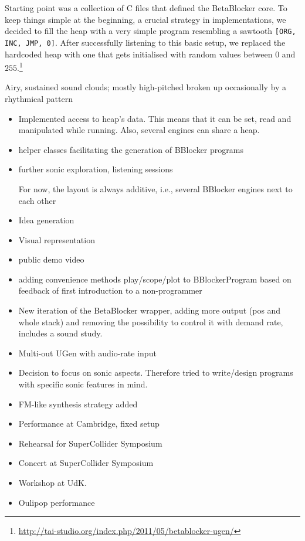 \documentclass[letterpaper, 12pt]{article}
\begin{document}
Starting point was a collection of C files that defined the BetaBlocker core.
To keep things simple at the beginning, a crucial strategy in implementations, we decided to fill the heap with a very simple program resembling a sawtooth \verb#[ORG, INC, JMP, 0]#. 
After successfully listening to this basic setup, we replaced the hardcoded heap with one that gets initialised with random values between $0$ and $255$.\footnote{\url{http://tai-studio.org/index.php/2011/05/betablocker-ugen/}}


Airy, sustained sound clouds; mostly high-pitched broken up occasionally by a rhythmical pattern


\begin{itemize}	 
\item Implemented access to heap's data. This means that it can be set, read and manipulated while running. Also, several engines can share a heap. 
\item helper classes facilitating the generation of BBlocker programs 
\item further sonic exploration, listening sessions 

	For now, the layout is always additive, i.e., several BBlocker engines next to each other

\item Idea generation
\item Visual representation
\item public demo video
\item adding convenience methods play/scope/plot to BBlockerProgram based on feedback of first introduction to a non-programmer
\item New iteration of the BetaBlocker wrapper, adding more output (pos and whole stack) and removing the possibility to control it with demand rate,
	includes a sound study.
\item Multi-out UGen with audio-rate input
\item Decision to focus on sonic aspects. Therefore tried to write/design programs with specific sonic features in mind.
\item FM-like synthesis strategy added
\item Performance at Cambridge, fixed setup
\item Rehearsal for SuperCollider Symposium
\item Concert at SuperCollider Symposium
\item Workshop at UdK.
\item Oulipop performance
\end{itemize}
\end{document}
